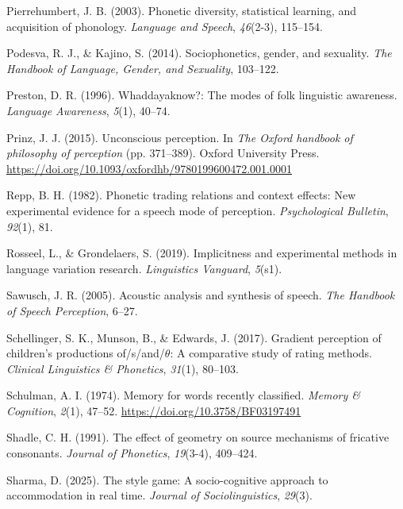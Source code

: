 \documentclass[
  letterpaper,
  DIV=11,
  numbers=noendperiod]{scrartcl}
\newlength{\cslhangindent}
\newenvironment{CSLReferences}[2] %
 {\begin{list}{}{%
  \setlength{\itemindent}{0pt}
  \setlength{\leftmargin}{0pt}
  \setlength{\parsep}{0pt}
  \ifodd #1
   \setlength{\leftmargin}{\cslhangindent}
   \setlength{\itemindent}{-1\cslhangindent}
  \fi
  \setlength{\itemsep}{#2\baselineskip}}}
 {\end{list}}
\begin{document}
\begin{CSLReferences}{1}{0}
Pierrehumbert, J. B. (2003). Phonetic diversity, statistical learning,
and acquisition of phonology. \emph{Language and Speech},
\emph{46}(2-3), 115--154.

Podesva, R. J., \& Kajino, S. (2014). Sociophonetics, gender, and
sexuality. \emph{The Handbook of Language, Gender, and Sexuality},
103--122.

Preston, D. R. (1996). Whaddayaknow?: The modes of folk linguistic
awareness. \emph{Language Awareness}, \emph{5}(1), 40--74.

Prinz, J. J. (2015). Unconscious perception. In \emph{The {Oxford}
handbook of philosophy of perception} (pp. 371--389). Oxford University
Press. \url{https://doi.org/10.1093/oxfordhb/9780199600472.001.0001}

Repp, B. H. (1982). Phonetic trading relations and context effects: New
experimental evidence for a speech mode of perception.
\emph{Psychological Bulletin}, \emph{92}(1), 81.

Rosseel, L., \& Grondelaers, S. (2019). Implicitness and experimental
methods in language variation research. \emph{Linguistics Vanguard},
\emph{5}(s1).

Sawusch, J. R. (2005). Acoustic analysis and synthesis of speech.
\emph{The Handbook of Speech Perception}, 6--27.

Schellinger, S. K., Munson, B., \& Edwards, J. (2017). Gradient
perception of children's productions of/s/and/\(\theta\): A comparative
study of rating methods. \emph{Clinical Linguistics \& Phonetics},
\emph{31}(1), 80--103.

Schulman, A. I. (1974). Memory for words recently classified.
\emph{Memory \& Cognition}, \emph{2}(1), 47--52.
\url{https://doi.org/10.3758/BF03197491}

Shadle, C. H. (1991). The effect of geometry on source mechanisms of
fricative consonants. \emph{Journal of Phonetics}, \emph{19}(3-4),
409--424.

Sharma, D. (2025). The style game: A socio-cognitive approach to
accommodation in real time. \emph{Journal of Sociolinguistics},
\emph{29}(3).


\end{CSLReferences}
\end{document}
